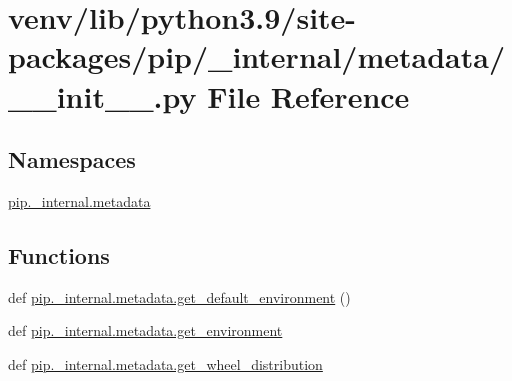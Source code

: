 \hypertarget{venv_2lib_2python3_89_2site-packages_2pip_2__internal_2metadata_2____init_____8py}{}\section{venv/lib/python3.9/site-\/packages/pip/\+\_\+internal/metadata/\+\_\+\+\_\+init\+\_\+\+\_\+.py File Reference}
\label{venv_2lib_2python3_89_2site-packages_2pip_2__internal_2metadata_2____init_____8py}
\subsection*{Namespaces}
\begin{DoxyCompactItemize}
\item 
 \hyperlink{namespacepip_1_1__internal_1_1metadata}{pip.\+\_\+internal.\+metadata}
\end{DoxyCompactItemize}
\subsection*{Functions}
\begin{DoxyCompactItemize}
\item 
def \hyperlink{namespacepip_1_1__internal_1_1metadata_a557d3ea9f61bbb867ce2a094fd21527e}{pip.\+\_\+internal.\+metadata.\+get\+\_\+default\+\_\+environment} ()
\item 
def \hyperlink{namespacepip_1_1__internal_1_1metadata_a71294b12a0a33814e0a35ef08efd607f}{pip.\+\_\+internal.\+metadata.\+get\+\_\+environment}
\item 
def \hyperlink{namespacepip_1_1__internal_1_1metadata_a2239286f23e90105939d56514e0d2ebd}{pip.\+\_\+internal.\+metadata.\+get\+\_\+wheel\+\_\+distribution}
\end{DoxyCompactItemize}
